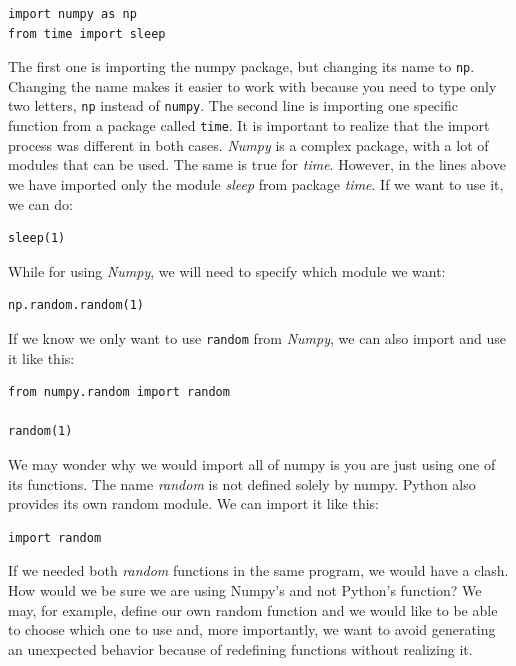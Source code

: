 \begin{verbatim}
import numpy as np
from time import sleep
\end{verbatim}

The first one is importing the numpy package, but changing its name to \texttt{np}. Changing the name makes it easier to work with because you need to type only two letters, \texttt{np} instead of \texttt{numpy}. The second line is importing one specific function from a package called \texttt{time}. It is important to realize that the import process was different in both cases. \emph{Numpy} is a complex package, with a lot of modules that can be used. The same is true for \emph{time}. However, in the lines above we have imported only the module \emph{sleep} from package \emph{time}. If we want to use it, we can do:

\begin{verbatim}
sleep(1)
\end{verbatim}

While for using \emph{Numpy}, we will need to specify which module we want:

\begin{verbatim}
np.random.random(1)
\end{verbatim}

If we know we only want to use \texttt{random} from \emph{Numpy}, we can also import and use it like this:

\begin{verbatim}
from numpy.random import random

random(1)
\end{verbatim}

We may wonder why we would import all of numpy is you are just using one of its functions. The name \emph{random} is not defined solely by numpy. Python also provides its own random module. We can import it like this:

\begin{verbatim}
import random
\end{verbatim}

If we needed both \emph{random} functions in the same program, we would have a clash. How would we be sure we are using Numpy's and not Python's function? We may, for example, define our own random function and we would like to be able to choose which one to use and, more importantly, we want to avoid generating an unexpected behavior because of redefining functions without realizing it.

